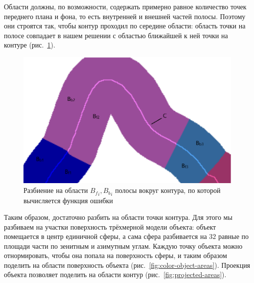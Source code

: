 Области должны, по возможности, содержать примерно равное количество точек
переднего плана и фона, то есть внутренней и внешней частей полосы.
Поэтому они строятся так, чтобы контур проходил по середине
области: область точки на полосе совпадает в нашем решении с областью ближайшей
к ней
точки на контуре (рис.~\ref{fig:fb_contour}).

\begin{figure}[t]
\centering
\includegraphics[width=\textwidth]{fig/fb_contour.png}
\caption{
Разбиение на области ${B_f}_i, {B_b}_i$ полосы вокруг контура, по которой
вычисляется функция ошибки
} \label{fig:fb_contour}
\end{figure}

Таким образом, достаточно разбить на области точки контура.
Для этого мы разбиваем на участки поверхность трёхмерной модели
объекта: объект помещается в центр единичной сферы, а сама сфера разбивается
на $32$ равные по площади части по зенитным и азимутным углам.
Каждую точку объекта можно отнормировать, чтобы она попала на поверхность
сферы, и таким образом поделить на области поверхность объекта
(рис.~\ref{fig:color-object-areas}).
Проекция объекта позволяет поделить на области контур
(рис.~\ref{fig:projected-areas}).

